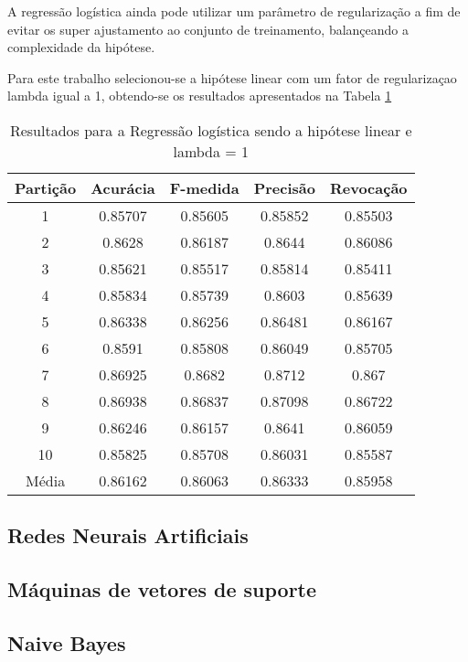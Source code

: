 A regressão logística ainda pode utilizar um parâmetro de regularização a fim de evitar os super ajustamento ao conjunto de treinamento, balançeando a complexidade da hipótese.

Para este trabalho selecionou-se a hipótese linear com um fator de regularizaçao lambda igual a 1, obtendo-se os resultados apresentados na Tabela \ref{table:resultadosRL}

\begin{table}[h]
\centering
\caption{Resultados para a Regressão logística sendo a hipótese linear e lambda = 1}
\vspace{0.2cm}
\begin{tabular}{c|c|c|c|c}
Partição & Acurácia & F-medida & Precisão & Revocação \\
\hline
1  & 0.85707 & 0.85605 & 0.85852 & 0.85503 \\      
2  & 0.8628  & 0.86187 & 0.8644  & 0.86086 \\      
3  & 0.85621 & 0.85517 & 0.85814 & 0.85411 \\      
4  & 0.85834 & 0.85739 & 0.8603  & 0.85639 \\      
5  & 0.86338 & 0.86256 & 0.86481 & 0.86167 \\      
6  & 0.8591  & 0.85808 & 0.86049 & 0.85705 \\      
7  & 0.86925 & 0.8682  & 0.8712  & 0.867   \\    
8  & 0.86938 & 0.86837 & 0.87098 & 0.86722 \\      
9  & 0.86246 & 0.86157 & 0.8641  & 0.86059 \\      
10 & 0.85825 & 0.85708 & 0.86031 & 0.85587 \\
\hline
Média & 0.86162 & 0.86063 & 0.86333 & 0.85958  

\end{tabular} 
\label{table:resultadosRL}
\end{table}

\subsection{Redes Neurais Artificiais}

\subsection{Máquinas de vetores de suporte}

\subsection{Naive Bayes}


